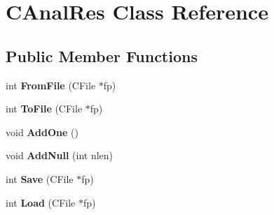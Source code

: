 \hypertarget{class_c_anal_res}{\section{C\-Anal\-Res Class Reference}
\label{class_c_anal_res}
}
\subsection*{Public Member Functions}
\begin{DoxyCompactItemize}
\item 
\hypertarget{class_c_anal_res_a8360d2de4d00f6f32a208f6b6ac1fcd8}{int {\bfseries From\-File} (C\-File $\ast$fp)}\label{class_c_anal_res_a8360d2de4d00f6f32a208f6b6ac1fcd8}

\item 
\hypertarget{class_c_anal_res_aaa22b52e0d30b8c1b79de35babc24f4a}{int {\bfseries To\-File} (C\-File $\ast$fp)}\label{class_c_anal_res_aaa22b52e0d30b8c1b79de35babc24f4a}

\item 
\hypertarget{class_c_anal_res_a8b384138b9073321b857fbeee1df7724}{void {\bfseries Add\-One} ()}\label{class_c_anal_res_a8b384138b9073321b857fbeee1df7724}

\item 
\hypertarget{class_c_anal_res_a8cecdc953ccc82fb39d04e7093c49c8c}{void {\bfseries Add\-Null} (int nlen)}\label{class_c_anal_res_a8cecdc953ccc82fb39d04e7093c49c8c}

\item 
\hypertarget{class_c_anal_res_a3a574fa4c62bd6d06f9a4aa0e9510b14}{int {\bfseries Save} (C\-File $\ast$fp)}\label{class_c_anal_res_a3a574fa4c62bd6d06f9a4aa0e9510b14}

\item 
\hypertarget{class_c_anal_res_a8cb6eb830cb87fdc953c4383c726d575}{int {\bfseries Load} (C\-File $\ast$fp)}\label{class_c_anal_res_a8cb6eb830cb87fdc953c4383c726d575}

\end{DoxyCompactItemize}
